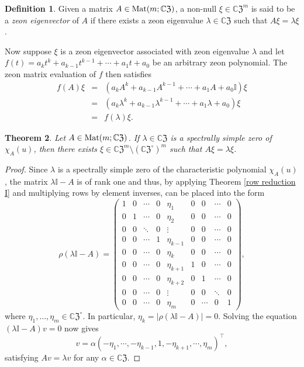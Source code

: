\documentclass{article}
\newtheorem{theorem}{Theorem}[section]
\theoremstyle{definition}
\newtheorem{definition}[theorem]{Definition}
\newcommand{\CZ}{\mathbb{C}\mathfrak{Z}}
\newcommand{\Mat}{{\rm Mat}}
\newcommand{\mI}{\mathbb{I}}
\numberwithin{equation}{section}
\begin{document}
\begin{definition}
Given a matrix $A\in \Mat(m;\CZ)$, a non-null $\xi\in{\CZ}^m$ is said to be a {\em zeon eigenvector} of $A$ if there exists a zeon eigenvalue $\lambda\in{\CZ}$ such that $A\xi=\lambda \xi$.
\end{definition}

Now suppose $\xi$ is a zeon eigenvector associated with zeon eigenvalue $\lambda$ and let $f(t)=a_kt^k+a_{k-1}t^{k-1}+\cdots+a_1 t+a_0$ be an arbitrary zeon polynomial.  The zeon matrix evaluation of $f$ then satisfies 
\begin{eqnarray*}
f(A)\xi&=&(a_kA^k+a_{k-1}A^{k-1}+\cdots+a_1 A+a_0\mI)\xi\\
&=&(a_k\lambda^k+a_{k-1}\lambda^{k-1}+\cdots+a_1 \lambda+a_0)\xi\\
&=&f(\lambda)\xi.
\end{eqnarray*}


\begin{theorem}\label{row reduction II}
Let $A\in\Mat(m;\CZ)$.  If $\lambda\in\CZ$ is a spectrally simple zero of $\chi_A(u)$, then there exists $\xi\in{\CZ}^m\setminus ({\CZ}^\circ)^m$ such that  $A\xi=\lambda\xi$.
\end{theorem}

\begin{proof}
Since $\lambda$ is a spectrally simple zero of the characteristic polynomial $\chi_A(u)$, the matrix $\lambda\mI-A$ is of rank one and thus, by applying Theorem \ref{row reduction I} and multiplying rows by element inverses, can be placed into the form 
\begin{equation*}
\rho(\lambda\mI-A)=\begin{pmatrix}
1&0 &\cdots&0&{\eta_1}&0&0&\cdots&0\\
0&1& \cdots&0&{\eta_2}&0&0&\cdots&0\\
0&0&\ddots&0&\vdots&0&0&\cdots&0\\
0&0&\cdots&1&{\eta_{k-1}}&0&0&\cdots&0\\
0&0&\cdots&0&\eta_k&0&0&\cdots&0\\
0&0&\cdots&0&{\eta_{k+1}}&1&0&\cdots&0\\
0&0&\cdots&0&{\eta_{k+2}}&0&1&\cdots&0\\
0&0&\cdots&0&\vdots&0&0&\ddots&0\\
0&0&\cdots&0&{\eta_{m}}&0&\cdots&0&1
\end{pmatrix},
\end{equation*}
where $\eta_1, \ldots, \eta_m\in\CZ^\circ$.  In particular, $\eta_k=\vert\rho(\lambda\mI-A)\vert=0$.  Solving the equation $(\lambda\mI-A)v=0$ now gives \begin{equation*}
v=\alpha\left(-{\eta_1},\cdots,-{\eta_{k-1}},1,-{\eta_{k+1}},\cdots,{\eta_m}\right)^\intercal,
\end{equation*}
satisfying $Av=\lambda v$ for any $\alpha\in\CZ$.

\end{proof}
\end{document}
